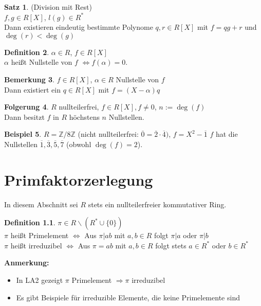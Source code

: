 \documentclass[10pt,a4paper,numbers=endperiod]{scrreprt}
\theoremstyle{definition}
\newtheorem{satz}{Satz}[section]
\newtheorem{defi}[satz]{Definition}
\newtheorem{bem}[satz]{Bemerkung}
\newtheorem{bsp}[satz]{Beispiel}
\newtheorem{folg}[satz]{Folgerung}
\def\ZZ{{\mathbb Z}}
\begin{document}
\begin{satz}
	(Division mit Rest)\\
	$f,g \in R[X]$, $l(g) \in R^*$\\
	Dann existieren eindeutig bestimmte Polynome $q,r \in R[X]$ mit $f = qg + r$ und $\deg(r) < \deg(g)$
\end{satz}

\begin{defi}
	$\alpha \in R$, $f \in R[X]$\\
	$\alpha$ heißt Nullstelle von $f$ $\Leftrightarrow f(\alpha) = 0$.
\end{defi}

\begin{bem}
	$f \in R[X]$, $\alpha \in R$ Nullstelle von $f$\\
	Dann existiert ein $q \in R[X]$ mit $f = (X- \alpha)q$
\end{bem}


\begin{folg}
	$R$ nullteilerfrei, $f \in R[X], f \neq 0$, $n := \deg(f)$\\
	Dann besitzt $f$ in $R$ höchstens $n$ Nullstellen.
\end{folg}

\begin{bsp}
	$R = \ZZ/8\ZZ$ (nicht nullteilerfrei: $\overline{0} = \overline{2} \cdot \overline{4})$, $f = X^2 - \overline{1}$ $f$ hat die Nullstellen $\overline{1}, \overline{3}, \overline{5}, \overline{7}$ (obwohl $\deg(f) = 2$). 
\end{bsp}

\chapter{Primfaktorzerlegung} 

In diesem Abschnitt sei $R$ stets ein nullteilerfreier kommutativer Ring.\\

\begin{defi}
	$\pi \in R \backslash (R^* \cup \{0\})$\\
	$\pi$ heißt Primelement $\Leftrightarrow$ Aus $\pi|ab$ mit $a,b \in R$ folgt $\pi|a$ oder $\pi|b$\\
	$\pi$ heißt irreduzibel $\Leftrightarrow$ Aus $\pi = ab$ mit $a,b \in R$ folgt stets $a \in R^*$ oder $b \in R^*$
\end{defi}

\textbf{Anmerkung:} \begin{itemize}
	\item In LA2 gezeigt $\pi$ Primelement $\Rightarrow \pi$ irreduzibel
	\item Es gibt Beispiele für irreduzible Elemente, die keine Primelemente sind
\end{itemize}
\end{document}
